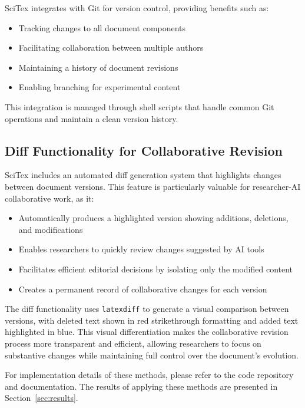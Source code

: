 SciTex integrates with Git for version control, providing benefits such as:

\begin{itemize}
    \item Tracking changes to all document components
    \item Facilitating collaboration between multiple authors
    \item Maintaining a history of document revisions
    \item Enabling branching for experimental content
\end{itemize}

This integration is managed through shell scripts that handle common Git operations and maintain a clean version history.

\subsection{Diff Functionality for Collaborative Revision}
\label{subsec:diff-functionality}

SciTex includes an automated diff generation system that highlights changes between document versions. This feature is particularly valuable for researcher-AI collaborative work, as it:

\begin{itemize}
    \item Automatically produces a highlighted version showing additions, deletions, and modifications
    \item Enables researchers to quickly review changes suggested by AI tools
    \item Facilitates efficient editorial decisions by isolating only the modified content
    \item Creates a permanent record of collaborative changes for each version
\end{itemize}

The diff functionality uses \texttt{latexdiff} to generate a visual comparison between versions, with deleted text shown in red strikethrough formatting and added text highlighted in blue. This visual differentiation makes the collaborative revision process more transparent and efficient, allowing researchers to focus on substantive changes while maintaining full control over the document's evolution.


For implementation details of these methods, please refer to the code repository and documentation. The results of applying these methods are presented in Section~\ref{sec:results}.

